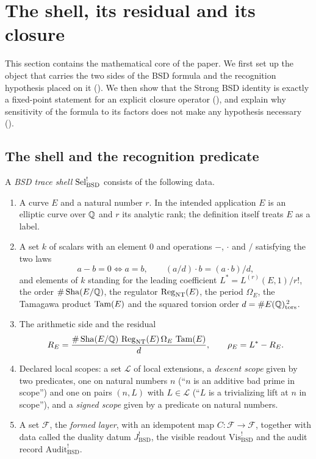 \section{The shell, its residual and its closure}
\label{sec:shell-readout}

This section contains the mathematical core of the paper.  We first set
up the object that carries the two sides of the BSD formula and the
recognition hypothesis placed on it ().
We then show that the Strong BSD identity is exactly a fixed-point
statement for an explicit closure operator (),
and explain why sensitivity of the formula to its factors does not make
any hypothesis necessary ().

\subsection{The shell and the recognition predicate}
\label{sec:shell-readout-basic}

\begin{definition}\label{def:closure:sel-bsd-shell}
A \emph{BSD trace shell} $\mathrm{Sel}^{!}_{\mathrm{BSD}}$ consists of the following data.
\begin{enumerate}
\item A curve $E$ and a natural number $r$.  In the intended application
  $E$ is an elliptic curve over $\mathbb{Q}$ and $r$ its analytic rank; the
  definition itself treats $E$ as a label.
\item A set $k$ of scalars with an element $0$ and operations $-$,
  $\cdot$ and $/$ satisfying the two laws
  \[
    a-b=0\iff a=b,
    \qquad
    (a/d)\cdot b=(a\cdot b)/d ,
  \]
  and elements of $k$ standing for the leading coefficient
  $L^*=L^{(r)}(E,1)/r!$, the order $\#\operatorname{Sha}(E/\mathbb{Q})$, the regulator
  $\operatorname{Reg}_{\mathrm{NT}}(E)$, the period $\Omega_E$, the Tamagawa product
  $\operatorname{Tam}(E)$ and the squared torsion order $d=\#E(\mathbb{Q})_{\operatorname{tors}}^{\,2}$.
\item The arithmetic side and the residual
  \[
    R_E=\frac{\#\operatorname{Sha}(E/\mathbb{Q})\,\operatorname{Reg}_{\mathrm{NT}}(E)\,\Omega_E\,\operatorname{Tam}(E)}{d},
    \qquad
    \rho_E=L^*-R_E .
  \]
\item Declared local scopes: a set $\mathcal L$ of local extensions, a
  \emph{descent scope} given by two predicates, one on natural numbers $n$
  (``$n$ is an additive bad prime in scope'') and one on pairs $(n,L)$
  with $L\in\mathcal L$ (``$L$ is a trivializing lift at $n$ in scope''),
  and a \emph{signed scope} given by a predicate on natural numbers.
\item A set $\mathcal F$, the \emph{formed layer}, with an idempotent map
  $C:\mathcal F\to\mathcal F$, together with data called the duality
  datum $J^{!}_{\mathrm{BSD}}$, the visible readout
  $\mathrm{Vis}^{!}_{\mathrm{BSD}}$ and the audit record
  $\mathrm{Audit}^{!}_{\mathrm{BSD}}$.
\end{enumerate}
\end{definition}

